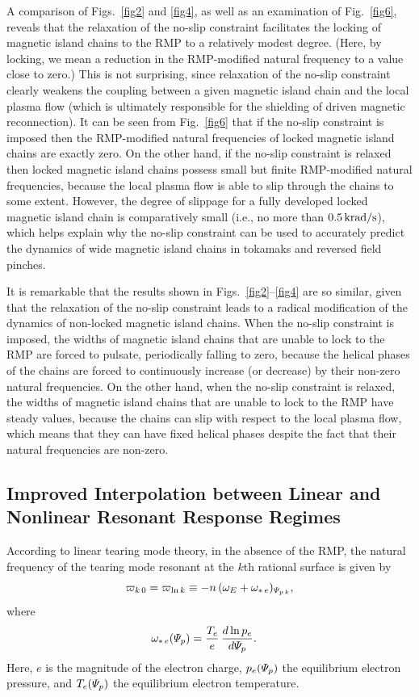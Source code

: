 \documentclass[12pt,prb,aps]{revtex4-1}
\begin{document}
A comparison of Figs.~\ref{fig2} and \ref{fig4}, as well as an examination of Fig.~\ref{fig6}, reveals that the relaxation of the
no-slip constraint facilitates the locking of magnetic island chains to the RMP to a relatively modest degree. (Here, by locking, we mean a reduction in the
RMP-modified natural frequency to a value close to zero.) 
This is not surprising, since
relaxation of the no-slip constraint clearly weakens the coupling between a given magnetic island chain and the local plasma flow (which is ultimately responsible
for the shielding of driven magnetic reconnection). 
It can be seen from Fig.~\ref{fig6} that if the no-slip constraint is imposed then the RMP-modified natural frequencies of locked magnetic
island chains are exactly zero. On the other hand, if the no-slip constraint is relaxed then locked magnetic island chains possess
 small but finite RMP-modified natural frequencies, because the local plasma flow is able to slip through the  chains to some
 extent. However, the degree of slippage for a fully developed locked magnetic island chain is comparatively small (i.e., no more than
 $0.5\,{\rm krad/s}$), which helps explain
 why the no-slip constraint can be used to accurately predict the dynamics of wide magnetic island chains in tokamaks and reversed field pinches.\cite{rfp} 

It is remarkable that the results shown in Figs.~\ref{fig2}--\ref{fig4} are so similar, given that the relaxation of the no-slip constraint leads to a
radical modification of the dynamics of non-locked magnetic island chains. When the no-slip constraint is imposed, the widths of magnetic island chains that are
unable to lock to the RMP are forced to pulsate, periodically falling to zero, because the helical phases of the chains are forced to
continuously increase (or decrease) by their non-zero natural frequencies.\cite{rfb,rfc,rfisland,rf1,pulse} On the other hand, when the no-slip
constraint is relaxed, the widths of magnetic island chains that are unable to lock to the RMP have steady values, because the  chains can
slip with respect to the local plasma flow, which means that they can have fixed helical phases despite the fact that their natural
frequencies are non-zero. 

\subsection{Improved Interpolation between Linear and Nonlinear Resonant Response Regimes}\label{s4b}
According to linear tearing mode theory, in the absence of the RMP, the natural frequency of the tearing mode resonant at the $k$th rational surface is given by\,\cite{ara,lin1,lin2,lin3}
\begin{equation}\label{elin}
\varpi_{k\,0} = \varpi_{{\rm ln}\,k} \equiv - n\,(\omega_E+\omega_{\ast\,e})_{{\mit\Psi}_{p\,k}},
\end{equation}
where
\begin{align}
\omega_{\ast\,e}({\mit\Psi}_p) &=\frac{T_e}{e}\,\frac{d\ln p_e}{d{\mit\Psi}_p}.
\end{align}
 Here,  $e$ is the magnitude of the electron charge,  $p_e({\mit\Psi}_p)$  the equilibrium
electron pressure, and $T_e({\mit\Psi}_p)$ the equilibrium
electron temperature.
\end{document}
